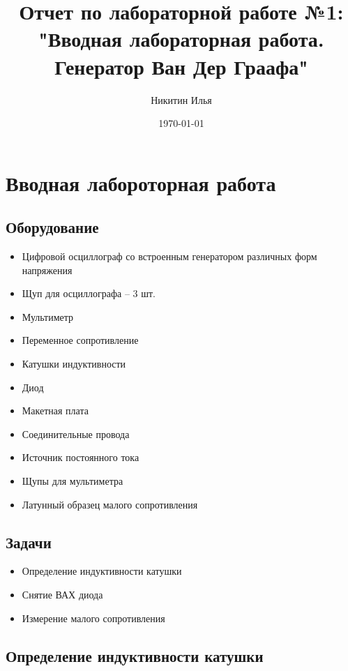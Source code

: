 \documentclass[a4paper,14pt]{extarticle}
\author{Никитин Илья}
\title{Отчет по лабораторной работе №1: "Вводная лабораторная работа. Генератор Ван Дер Граафа"}
\date{\today}
\begin{document}
	
	\maketitle
	\tableofcontents
	
	\section{Вводная лабороторная работа}
		\tableofcontents
		\subsection{Оборудование}
			\begin{itemize}
				\item Цифровой осциллограф со встроенным генератором различных
				форм напряжения
				\item Щуп для осциллографа – 3 шт.
				\item Мультиметр
				\item Переменное сопротивление 
				\item Катушки индуктивности 
				\item Диод 
				\item Макетная плата 
				\item Соединительные провода 
				\item Источник постоянного тока 
				\item Щупы для мультиметра 
				\item Латунный образец малого сопротивления
			\end{itemize}
		\subsection{Задачи}
			\begin{itemize}
				\item Определение индуктивности катушки
				\item Снятие ВАХ диода
				\item Измерение малого сопротивления
			\end{itemize}
		\subsection{Определение индуктивности катушки}
\end{document}
